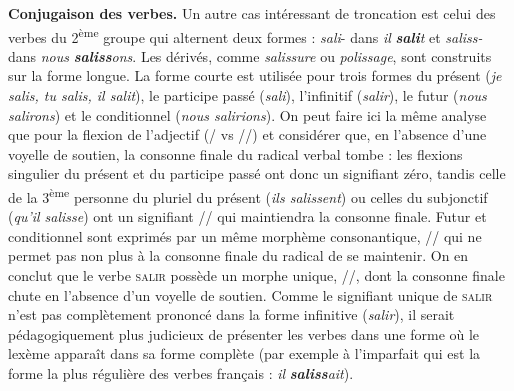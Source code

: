 {    \textbf{Conjugaison des verbes.} Un autre cas intéressant de troncation est celui des verbes du 2\textsuperscript{ème} groupe qui alternent deux formes : \textit{sali}{}- dans \textit{il} \textbf{\textit{sali}}\textit{t} et \textit{saliss-} dans \textit{nous} \textbf{\textit{saliss}}\textit{ons}. Les dérivés, comme \textit{salissure} ou \textit{polissage}, sont construits sur la forme longue. La forme courte est utilisée pour trois formes du présent (\textit{je salis, tu salis, il salit}), le participe passé (\textit{sali}), l’infinitif (\textit{salir}), le futur (\textit{nous salirons}) et le conditionnel (\textit{nous salirions}). On peut faire ici la même analyse que pour la flexion de l’adjectif (/ vs //) et considérer que, en l’absence d’une voyelle de soutien, la consonne finale du radical verbal tombe : les flexions singulier du présent et du participe passé ont donc un signifiant zéro, tandis celle de la 3\textsuperscript{ème} personne du pluriel du présent (\textit{ils salissent}) ou celles du subjonctif (\textit{qu’il salisse}) ont un signifiant \textstylePhonoApprofondissement{{}-}// qui maintiendra la consonne finale. Futur et conditionnel sont exprimés par un même morphème consonantique, \textstylePhonoApprofondissement{{}-}//\textstylePhonoApprofondissement{{}-} qui ne permet pas non plus à la consonne finale du radical de se maintenir. On en conclut que le verbe \textsc{salir} possède un morphe unique, //, dont la consonne finale chute en l’absence d’un voyelle de soutien. Comme le signifiant unique de \textsc{salir} n’est pas complètement prononcé dans la forme infinitive (\textit{salir}), il serait pédagogiquement plus judicieux de présenter les verbes dans une forme où le lexème apparaît dans sa forme complète (par exemple à l’imparfait qui est la forme la plus régulière des verbes français : \textit{il} \textbf{\textit{saliss}}\textit{ait}).

}
